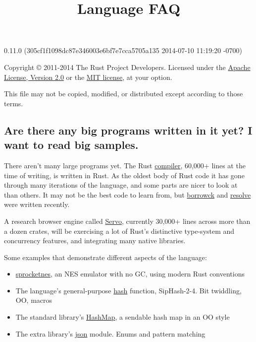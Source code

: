 \documentclass[]{article}
\title{Language FAQ}
\begin{document}
\maketitle

0.11.0 (305cf1f1098dc87e346003e6bf7e7cca5705a135 2014-07-10 11:19:20 -0700)

Copyright © 2011-2014 The Rust Project Developers. Licensed under the
\href{http://www.apache.org/licenses/LICENSE-2.0}{Apache License,
Version 2.0} or the \href{http://opensource.org/licenses/MIT}{MIT
license}, at your option.

This file may not be copied, modified, or distributed except according
to those terms.

{
\hypersetup{linkcolor=black}
\setcounter{tocdepth}{3}
\tableofcontents
}
\subsection{Are there any big programs written in it yet? I want to read
big
samples.}\label{are-there-any-big-programs-written-in-it-yet-i-want-to-read-big-samples.}

There aren't many large programs yet. The Rust
\href{https://github.com/rust-lang/rust/tree/master/src/librustc}{compiler},
60,000+ lines at the time of writing, is written in Rust. As the oldest
body of Rust code it has gone through many iterations of the language,
and some parts are nicer to look at than others. It may not be the best
code to learn from, but
\href{https://github.com/rust-lang/rust/blob/master/src/librustc/middle/borrowck/}{borrowck}
and
\href{https://github.com/rust-lang/rust/blob/master/src/librustc/middle/resolve.rs}{resolve}
were written recently.

A research browser engine called
\href{https://github.com/mozilla/servo}{Servo}, currently 30,000+ lines
across more than a dozen crates, will be exercising a lot of Rust's
distinctive type-system and concurrency features, and integrating many
native libraries.

Some examples that demonstrate different aspects of the language:

\begin{itemize}
\itemsep1pt\parskip0pt
\item
  \href{https://github.com/pcwalton/sprocketnes}{sprocketnes}, an NES
  emulator with no GC, using modern Rust conventions
\item
  The language's general-purpose
  \href{https://github.com/rust-lang/rust/blob/master/src/libstd/hash/mod.rs}{hash}
  function, SipHash-2-4. Bit twiddling, OO, macros
\item
  The standard library's
  \href{https://github.com/rust-lang/rust/blob/master/src/libcollections/hashmap.rs}{HashMap},
  a sendable hash map in an OO style
\item
  The extra library's
  \href{https://github.com/rust-lang/rust/blob/master/src/libserialize/json.rs}{json}
  module. Enums and pattern matching
\end{itemize}
\end{document}
